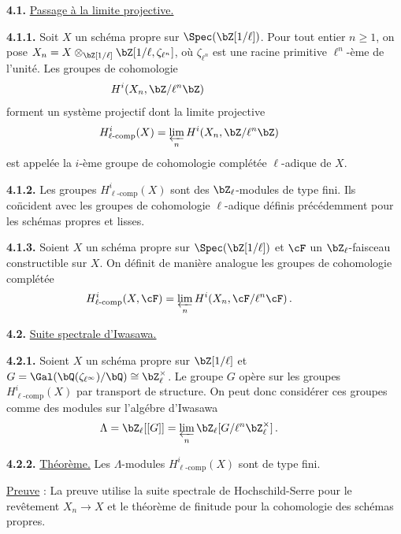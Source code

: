 \noindent
\textbf{4.1.} \underline{Passage \`a la limite projective.}

\noindent
\textbf{4.1.1.} Soit $X$ un sch\'ema propre sur $\Spec(\bZ[1/\ell])$. Pour tout entier $n \geq 1$, on pose $X_n = X \otimes_{\bZ[1/\ell]} \bZ[1/\ell, \zeta_{\ell^n}]$, o\`u $\zeta_{\ell^n}$ est une racine primitive $\ell^n$-\`eme de l'unit\'e. Les groupes de cohomologie
\[
H^i(X_n, \bZ/\ell^n\bZ)\hspace*{3cm}
\]
forment un syst\`eme projectif dont la limite projective
\[
H^i_{\ell\text{-}\mathrm{comp}}(X) = \varprojlim_{n} H^i(X_n, \bZ/\ell^n\bZ)\hspace*{1cm}
\]
est appel\'ee la $i$-\`eme groupe de cohomologie compl\'et\'ee $\ell$-adique de $X$.

\smallskip

\noindent
\textbf{4.1.2.} Les groupes $H^i_{\ell\text{-}\mathrm{comp}}(X)$ sont des $\bZ_{\ell}$-modules de type fini. Ils co\"  ncident avec les groupes de cohomologie $\ell$-adique d\'efinis pr\'ec\'edemment pour les sch\'emas propres et lisses.

\smallskip

\noindent
\textbf{4.1.3.} Soient $X$ un sch\'ema propre sur $\Spec(\bZ[1/\ell])$ et $\cF$ un $\bZ_{\ell}$-faisceau constructible sur $X$. On d\'efinit de mani\`ere analogue les groupes de cohomologie compl\'et\'ee
\[
H^i_{\ell\text{-}\mathrm{comp}}(X, \cF) = \varprojlim_{n} H^i(X_n, \cF/\ell^n \cF)\,.\hspace*{1cm}
\]

\bigskip

\noindent
\textbf{4.2.} \underline{Suite spectrale d'Iwasawa.}

\noindent
\textbf{4.2.1.} Soient $X$ un sch\'ema propre sur $\bZ[1/\ell]$ et $G = \Gal(\bQ(\zeta_{\ell^{\infty}})/\bQ) \cong \bZ_{\ell}^{\times}$. Le groupe $G$ op\`ere sur les groupes $H^i_{\ell\text{-}\mathrm{comp}}(X)$ par transport de structure. On peut donc consid\'erer ces groupes comme des modules sur l'alg\'ebre d'Iwasawa
\[
\Lambda = \bZ_{\ell}[[G]] = \varprojlim_{n} \bZ_{\ell}[G/\ell^n \bZ_{\ell}^{\times}]\,.\hspace*{1cm}
\]

\smallskip

\noindent
\textbf{4.2.2.} \underline{Th\'eor\`eme.} Les $\Lambda$-modules $H^i_{\ell\text{-}\mathrm{comp}}(X)$ sont de type fini.

\smallskip

\noindent
\underline{Preuve} : La preuve utilise la suite spectrale de Hochschild-Serre pour le rev\^etement $X_n \rightarrow X$ et le th\'eor\`eme de finitude pour la cohomologie des sch\'emas propres.

